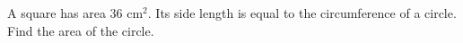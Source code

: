 A square has area $36\text{ cm}^2$. Its side length is equal to the circumference of a circle. Find the area of the circle.
